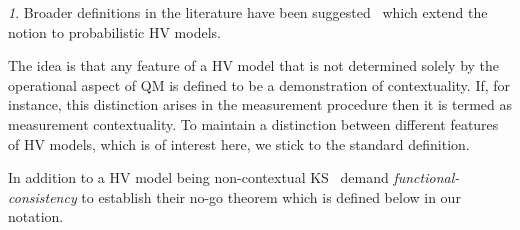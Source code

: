 \documentclass[doublecol,british]{epl2}
\theoremstyle{plain}
\theoremstyle{plain}
\theoremstyle{definition}
\theoremstyle{remark}
\theoremstyle{remark}
\newtheorem{defnrem}{\protect\remarkname}[defn]
\theoremstyle{remark}
\theoremstyle{plain}
\theoremstyle{plain}
\theoremstyle{plain}
\theoremstyle{definition}
\theoremstyle{definition}
\providecommand{\remarkname}{Remark}
\begin{document}
\begin{defnrem}
{ Broader definitions in the literature have
been suggested~\cite{spekkens_pra} which extend the notion
to probabilistic HV models. 

The idea is that any feature of
a HV model that is not determined solely by the operational
aspect of QM is defined to be a demonstration of contextuality. 
If, for instance, this distinction arises in the measurement procedure
then it is termed as measurement contextuality.
To maintain a
distinction between different features of HV models, which
is of interest here, we stick to the standard definition.}

\end{defnrem}

{ 
In addition to a HV model being non-contextual KS~\cite{KochenSpecker} demand \emph{functional-consistency} to establish their no-go theorem which is defined below in our notation.
}

\end{document}
